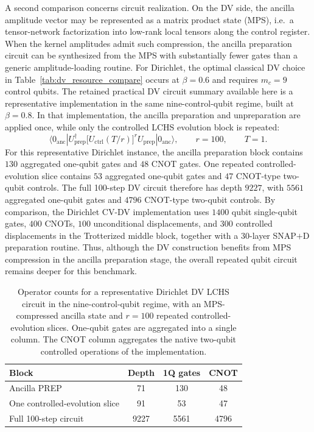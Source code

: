 A second comparison concerns circuit realization. On the DV side, the ancilla amplitude vector may be represented as a matrix product state (MPS), i.e.\ a tensor-network factorization into low-rank local tensors along the control register. When the kernel amplitudes admit such compression, the ancilla preparation circuit can be synthesized from the MPS with substantially fewer gates than a generic amplitude-loading routine. For Dirichlet, the optimal classical DV choice in Table~\ref{tab:dv_resource_compare} occurs at $\beta=0.6$ and requires $m_c=9$ control qubits. The retained practical DV circuit summary available here is a representative implementation in the same nine-control-qubit regime, built at $\beta=0.8$. In that implementation, the ancilla preparation and unpreparation are applied once, while only the controlled LCHS evolution block is repeated:
\[
\langle 0_{\mathrm{anc}}|
U_{\mathrm{prep}}^\dagger
\bigl[U_{\mathrm{ctrl}}(T/r)\bigr]^r
U_{\mathrm{prep}}
|0_{\mathrm{anc}}\rangle,
\qquad r=100,
\qquad T=1.
\]
For this representative Dirichlet instance, the ancilla preparation block contains $130$ aggregated one-qubit gates and $48$ CNOT gates. One repeated controlled-evolution slice contains $53$ aggregated one-qubit gates and $47$ CNOT-type two-qubit controls. The full 100-step DV circuit therefore has depth $9227$, with $5561$ aggregated one-qubit gates and $4796$ CNOT-type two-qubit controls. By comparison, the Dirichlet CV-DV implementation uses $1400$ qubit single-qubit gates, $400$ CNOTs, $100$ unconditional displacements, and $300$ controlled displacements in the Trotterized middle block, together with a $30$-layer SNAP$+$D preparation routine. Thus, although the DV construction benefits from MPS compression in the ancilla preparation stage, the overall repeated qubit circuit remains deeper for this benchmark.

\begin{table}[h]
\centering
{\small
\caption{Operator counts for a representative Dirichlet DV LCHS circuit in the nine-control-qubit regime, with an MPS-compressed ancilla state and $r=100$ repeated controlled-evolution slices. One-qubit gates are aggregated into a single column. The CNOT column aggregates the native two-qubit controlled operations of the implementation.}
\label{tab:dv_circuit_compare}
\begin{tabular}{lccc}
\toprule
Block & Depth & 1Q gates & CNOT \\
\midrule
Ancilla PREP & 71 & 130 & 48 \\
One controlled-evolution slice & 91 & 53 & 47 \\
Full 100-step circuit & 9227 & 5561 & 4796 \\
\bottomrule
\end{tabular}}
\end{table}

